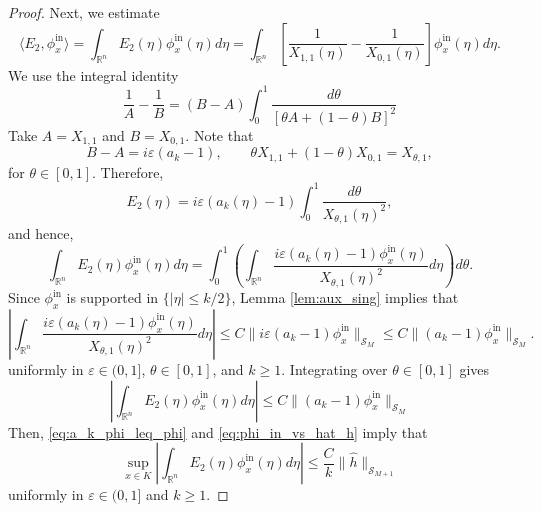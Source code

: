 \documentclass[12pt,a4paper]{amsart}
\numberwithin{equation}{section}
\theoremstyle{plain}
\theoremstyle{definition}
\begin{document}
\begin{proof}
Next, we estimate 
\begin{equation*}
    \langle E_2, \phi_x^{\mathrm{in}} \rangle = \int_{\mathbb{R}^n}
    E_2(\eta) \phi_x^{\mathrm{in}}(\eta) d\eta 
    = 
    \int_{\mathbb{R}^n}
    \left[\frac{1}{X_{1,1}(\eta)} - \frac{1}{X_{0,1}(\eta)}\right]\phi_x^{\mathrm{in}}(\eta) d\eta.
\end{equation*}
We use the integral identity
\begin{equation}\label{eq:resolvent_identity_param}
\frac{1}{A} - \frac{1}{B}
=
(B - A) \int_0^1 \frac{d\theta}{[\theta A + (1-\theta)B]^2}
\end{equation}
Take $A = X_{1,1}$ and $B = X_{0,1}$. Note that
\begin{equation*}
    B - A =  i\varepsilon (a_k - 1),
    \qquad
    \theta X_{1,1} + (1-\theta) X_{0,1} = X_{\theta,1},
\end{equation*}
for $\theta \in [0,1]$. Therefore, 
\begin{equation}\label{eq:E2_param}
    E_2(\eta) = i\varepsilon(a_k(\eta) - 1)
    \int_0^1 \frac{d\theta}{X_{\theta,1}(\eta)^2},
\end{equation}
and hence,
\begin{equation*}
    \int_{\mathbb{R}^n} E_2(\eta) \phi_x^{\mathrm{in}}(\eta) d\eta
    =
    \int_0^1 \left( \int_{\mathbb{R}^n} \frac{i\varepsilon(a_k(\eta)-1) \phi_x^{\mathrm{in}}(\eta)}
     {X_{\theta,1}(\eta)^2} d\eta
    \right) d\theta.
\end{equation*}
Since $\phi_x^{\mathrm{in}}$ is supported in $\{|\eta| \leq k/2\}$, Lemma \ref{lem:aux_sing} implies that 
\begin{equation*}
    \left|\int_{\mathbb{R}^n} \frac{i\varepsilon(a_k(\eta)-1) \phi_x^{\mathrm{in}}(\eta)}{X_{\theta,1}(\eta)^2} d\eta\right|
    \leq
    C \|i\varepsilon(a_k-1) \phi_x^{\mathrm{in}}\|_{\mathscr{S}_M}
    \leq
    C \|(a_k-1) \phi_x^{\mathrm{in}}\|_{\mathscr{S}_M}.
\end{equation*}
uniformly in $\varepsilon\in (0,1]$, $\theta\in [0,1]$, and $k\geq 1$. Integrating over $\theta \in [0,1]$ gives
\begin{equation*}
    \left| \int_{\mathbb{R}^n} E_2(\eta) \phi_x^{\mathrm{in}}(\eta) d\eta \right| \leq C \|(a_k-1) \phi_x^{\mathrm{in}}\|_{\mathscr{S}_M}
\end{equation*}
Then, \eqref{eq:a_k_phi_leq_phi} and \eqref{eq:phi_in_vs_hat_h} imply that
\begin{equation}\label{eq:E2}
     \sup_{x \in K}\left|\int_{\mathbb{R}^n} E_2(\eta) \phi_x^{\mathrm{in}}(\eta) d\eta \right| \leq \frac{C}{k} \|\widehat h\|_{\mathscr{S}_{M+1}} 
\end{equation}
uniformly in $\varepsilon \in (0,1]$ and $k\geq 1$.


\end{proof}
\end{document}
